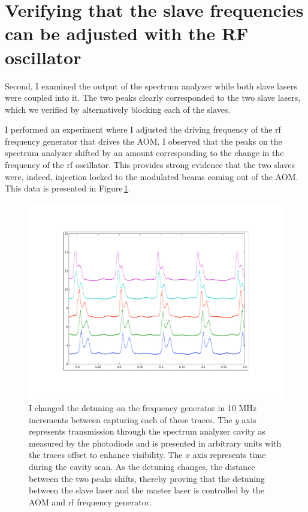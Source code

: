 \section{Verifying that the slave frequencies can be adjusted with the RF oscillator}
Second, I examined the output of the spectrum analyzer while both slave lasers were coupled into it. 
The two peaks clearly corresponded to the two slave lasers, which we verified by alternatively blocking each of the slaves. 


I performed an experiment where I adjusted the driving frequency of the rf frequency generator that drives the AOM. I observed that the peaks on the spectrum analyzer shifted by an amount corresponding to the change in the frequency of the rf oscillator. This provides strong evidence that the two slaves were, indeed, injection locked to the modulated beams coming out of the AOM. This data is presented in Figure\,\ref{fig:typicaldata}.


 
\begin{figure}
    \centerline{\includegraphics{sampleOffsetData}}
    \caption[]{\label{fig:typicaldata}
    I changed the detuning on the frequency generator in 10 MHz increments between capturing each of these traces. The $y$ axis represents transmission through the spectrum analyzer cavity as measured by the photodiode and is presented in arbitrary units with the traces offset to enhance visibility. The $x$ axis represents time during the cavity scan. As the detuning changes, the distance between the two peaks shifts, thereby proving that the detuning between the slave laser and the master laser is controlled by the AOM and rf frequency generator.}
\end{figure}

